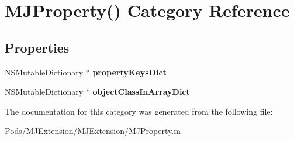 \hypertarget{category_m_j_property_07_08}{}\section{M\+J\+Property() Category Reference}
\label{category_m_j_property_07_08}
\subsection*{Properties}
\begin{DoxyCompactItemize}
\item 
\mbox{\label{category_m_j_property_07_08_a30108dc59cb07165b0f3b4a66eaa98d7}} 
N\+S\+Mutable\+Dictionary $\ast$ {\bfseries property\+Keys\+Dict}
\item 
\mbox{\label{category_m_j_property_07_08_a1d84dfbdbaa83ba3502630ec6c44735d}} 
N\+S\+Mutable\+Dictionary $\ast$ {\bfseries object\+Class\+In\+Array\+Dict}
\end{DoxyCompactItemize}


The documentation for this category was generated from the following file\+:\begin{DoxyCompactItemize}
\item 
Pods/\+M\+J\+Extension/\+M\+J\+Extension/M\+J\+Property.\+m\end{DoxyCompactItemize}
